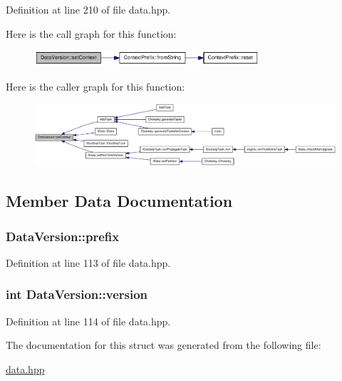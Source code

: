 Definition at line 210 of file data.hpp.

Here is the call graph for this function:\nopagebreak
\begin{figure}[H]
\begin{center}
\leavevmode
\includegraphics[width=237pt]{struct_data_version_a987f2c352ed0c65a7e9d83a1cabebb66_cgraph}
\end{center}
\end{figure}


Here is the caller graph for this function:\nopagebreak
\begin{figure}[H]
\begin{center}
\leavevmode
\includegraphics[width=420pt]{struct_data_version_a987f2c352ed0c65a7e9d83a1cabebb66_icgraph}
\end{center}
\end{figure}


\subsection{Member Data Documentation}
\hypertarget{struct_data_version_a8ec5ea0ad23078789d890065f3845afb}{
\subsubsection[{prefix}]{ {\bf DataVersion::prefix}}}
\label{struct_data_version_a8ec5ea0ad23078789d890065f3845afb}


Definition at line 113 of file data.hpp.\hypertarget{struct_data_version_a7cb16122eaf6066df7eb0fff6687fead}{
\subsubsection[{version}]{\setlength{\rightskip}{0pt plus 5cm}int {\bf DataVersion::version}}}
\label{struct_data_version_a7cb16122eaf6066df7eb0fff6687fead}


Definition at line 114 of file data.hpp.

The documentation for this struct was generated from the following file:\begin{DoxyCompactItemize}
\item 
\hyperlink{data_8hpp}{data.hpp}\end{DoxyCompactItemize}
